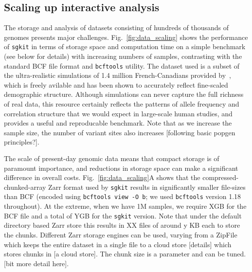 \documentclass[9pt,lineno]{elife}
\newcommand{\toolname}[1]{\texttt{#1}}
\begin{document}
\subsection{Scaling up interactive analysis}
The storage and analysis of datasets consisting of hundreds of
thousands of genomes presents major challenges.
Fig.~\ref{fig:data_scaling} shows the performance of \toolname{sgkit}
in terms of storage space and computation time  on a simple benchmark (see
below for details) with increasing
numbers of samples, contrasting with the standard BCF file format
and \toolname{bcftools} utility.
The dataset used is a subset of the
ultra-realistic simulations of 1.4 million French-Canadians
provided by~\citet{anderson2023genes}, which is freely avilable
and has been shown to
accurately reflect fine-scaled demographic structure.
Although
simulations can never capture the full richness of real data,
this resource certainly reflects the patterns of allele frequency
and correlation structure that we would expect in large-scale
human studies, and provides a useful and reproducable benchmark.
Note that as we increase the sample size, the number of variant
sites also increases [following basic popgen principles?].

The scale of present-day genomic data means that compact
storage is of paramount importance, and reductions in storage space
can make a significant difference in overall costs.
Fig.~\ref{fig:data_scaling}A shows that the
compressed-chunked-array Zarr format used by \toolname{sgkit} results
in significantly smaller file-sizes than BCF (encoded using
\texttt{bcftools view -O b}; we used \toolname{bcftools}
version 1.18 throughout). At the extreme, when we have 1M
samples, we require XGB for the BCF file and a total of YGB
for the \toolname{sgkit} version. Note that under the default
directory based Zarr store this results in XX files of around
y KB each to store the chunks. Different Zarr storage engines
can be used, varying from a ZipFile which keeps the entire
dataset in a single file to a cloud store [details] which stores
chunks in [a cloud store]. The chunk size is a parameter and
can be tuned. [bit more detail here].
\end{document}
